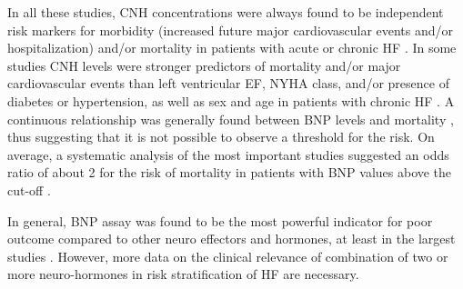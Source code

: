 \documentclass[14pt,a4paper,onecolumn]{extarticle}
\begin{document}
In all these studies, CNH concentrations were always found to be independent risk markers for morbidity (increased future major cardiovascular events and/or hospitalization) and/or mortality in patients with acute or chronic HF \citep{bib35}. In some studies CNH levels were stronger predictors of mortality and/or major cardiovascular events than left ventricular EF, NYHA class, and/or presence of diabetes or hypertension, as well as sex and age in patients with chronic HF \citep{bib3188} \citep{bib3189} \citep{bib3192} \citep{bib3194} \citep{bib3195} \citep{bib3196} \citep{bib3198} \citep{bib3199}.
A continuous relationship was generally found between BNP levels and mortality \citep{bib3194}, thus suggesting that it is not possible to observe a threshold for the risk. On average, a systematic analysis of the most important studies suggested an odds ratio of about 2 for the risk of mortality in patients with BNP values above the cut-off \citep{bib35}.


In general, BNP assay was found to be the most powerful indicator for poor outcome compared to other neuro effectors and hormones, at least in the largest studies \citep{bib35} \citep{bib3204} \citep{bib3206}. However, more data on the clinical relevance of combination of two or more neuro-hormones in risk stratification of HF are necessary.
\end{document}
